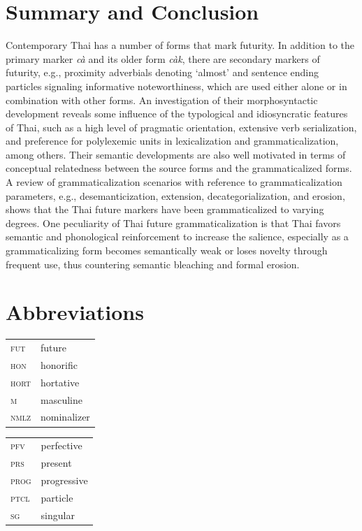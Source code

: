 \documentclass[output=paper,colorlinks,citecolor=brown]{langscibook}
\begin{document}
\section{Summary and Conclusion}\label{sec:khammee:4}

Contemporary Thai has a number of forms that mark futurity. In addition to the primary marker \textit{cà} and its older form \textit{càk}, there are secondary markers of futurity, e.g., proximity adverbials denoting ‘almost’ and sentence ending particles signaling informative noteworthiness, which are used either alone or in combination with other forms. An investigation of their morphosyntactic development reveals some influence of the typological and idiosyncratic features of Thai, such as a high level of pragmatic orientation, extensive verb serialization, and preference for polylexemic units in lexicalization and grammaticalization, among others. Their semantic developments are also well motivated in terms of conceptual relatedness between the source forms and the grammaticalized forms. A review of grammaticalization scenarios with reference to grammaticalization parameters, e.g., desemanticization, extension, decategorialization, and erosion, shows that the Thai future markers have been grammaticalized to varying degrees. One peculiarity of Thai future grammaticalization is that Thai favors semantic and phonological reinforcement to increase the salience, especially as a grammaticalizing form becomes semantically weak or loses novelty through frequent use, thus countering semantic bleaching and formal erosion.





\section*{Abbreviations}
\begin{tabularx}{.5\textwidth}{@{}lQ@{}}
\textsc{fut} & future \\
\textsc{hon} & honorific \\
\textsc{hort} & hortative \\
\textsc{m} & masculine \\
\textsc{nmlz} & nominalizer \\
\end{tabularx}%
\begin{tabularx}{.5\textwidth}{@{}lQ@{}}
\textsc{pfv} & perfective \\
\textsc{prs} & present \\
\textsc{prog} & progressive \\
\textsc{ptcl} & particle \\
\textsc{sg} & singular \\
\end{tabularx}
\end{document}
